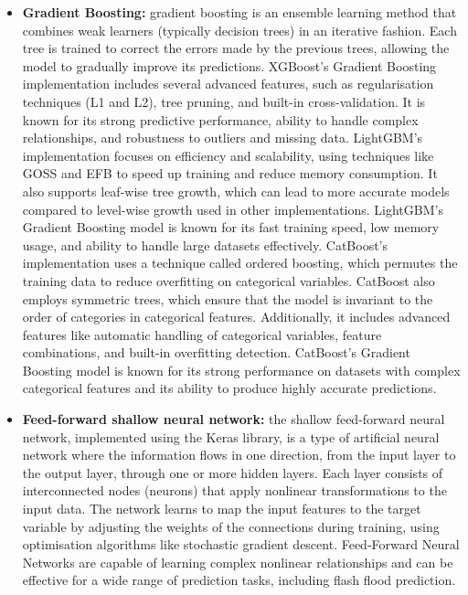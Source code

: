 \begin{itemize}
    \item \textbf{Gradient Boosting:} gradient boosting is an ensemble learning method that combines weak learners (typically decision trees) in an iterative fashion. Each tree is trained to correct the errors made by the previous trees, allowing the model to gradually improve its predictions. XGBoost's Gradient Boosting implementation includes several advanced features, such as regularisation techniques (L1 and L2), tree pruning, and built-in cross-validation. It is known for its strong predictive performance, ability to handle complex relationships, and robustness to outliers and missing data. LightGBM's implementation focuses on efficiency and scalability, using techniques like GOSS and EFB to speed up training and reduce memory consumption. It also supports leaf-wise tree growth, which can lead to more accurate models compared to level-wise growth used in other implementations. LightGBM's Gradient Boosting model is known for its fast training speed, low memory usage, and ability to handle large datasets effectively. CatBoost's implementation uses a technique called ordered boosting, which permutes the training data to reduce overfitting on categorical variables. CatBoost also employs symmetric trees, which ensure that the model is invariant to the order of categories in categorical features. Additionally, it includes advanced features like automatic handling of categorical variables, feature combinations, and built-in overfitting detection. CatBoost's Gradient Boosting model is known for its strong performance on datasets with complex categorical features and its ability to produce highly accurate predictions.
    
    \item \textbf{Feed-forward shallow neural network:} the shallow feed-forward neural network, implemented using the Keras library, is a type of artificial neural network where the information flows in one direction, from the input layer to the output layer, through one or more hidden layers. Each layer consists of interconnected nodes (neurons) that apply nonlinear transformations to the input data. The network learns to map the input features to the target variable by adjusting the weights of the connections during training, using optimisation algorithms like stochastic gradient descent. Feed-Forward Neural Networks are capable of learning complex nonlinear relationships and can be effective for a wide range of prediction tasks, including flash flood prediction.

\end{itemize}

